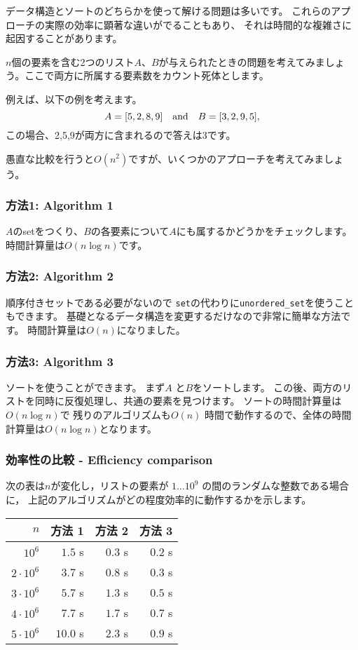 データ構造とソートのどちらかを使って解ける問題は多いです。
これらのアプローチの実際の効率に顕著な違いがでることもあり、
それは時間的な複雑さに起因することがあります。

$n$個の要素を含む2つのリスト$A$、$B$が与えられたときの問題を考えてみましょう。ここで両方に所属する要素数をカウント死体とします。

例えば、以下の例を考えます。
\[A = [5,2,8,9] \hspace{10px} \textrm{and} \hspace{10px} B = [3,2,9,5],\]
この場合、2,5,9が両方に含まれるので答えは3です。

愚直な比較を行うと$O(n^2)$ですが、いくつかのアプローチを考えてみましょう。

\subsubsection{方法1: Algorithm 1}

$A$のsetをつくり、$B$の各要素について$A$にも属するかどうかをチェックします。
時間計算量は$O(n \log n)$です。

\subsubsection{方法2: Algorithm 2}

順序付きセットである必要がないので
\texttt{set}の代わりに\texttt{unordered\_set}を使うこともできます。
基礎となるデータ構造を変更するだけなので非常に簡単な方法です。
時間計算量は$O(n)$になりました。

\subsubsection{方法3: Algorithm 3}

ソートを使うことができます。
まず$A$ と$B$をソートします。
この後、両方のリストを同時に反復処理し、共通の要素を見つけます。
ソートの時間計算量は$O(n \log n)$で
残りのアルゴリズムも$O(n)$ 時間で動作するので、全体の時間計算量は$O(n \log n)$となります。

\subsubsection{効率性の比較 - Efficiency comparison}

次の表は$n$が変化し，リストの要素が $1 \ldots 10^9$ の間のランダムな整数である場合に，
上記のアルゴリズムがどの程度効率的に動作するかを示します。
\begin{center}
\begin{tabular}{rrrr}
$n$ & 方法 1 & 方法 2 & 方法 3 \\
\hline
$10^6$ & $1.5$ s & $0.3$ s & $0.2$ s \\
$2 \cdot 10^6$ & $3.7$ s & $0.8$ s & $0.3$ s \\
$3 \cdot 10^6$ & $5.7$ s & $1.3$ s & $0.5$ s \\
$4 \cdot 10^6$ & $7.7$ s & $1.7$ s & $0.7$ s \\
$5 \cdot 10^6$ & $10.0$ s & $2.3$ s & $0.9$ s \\
\end{tabular}
\end{center}

